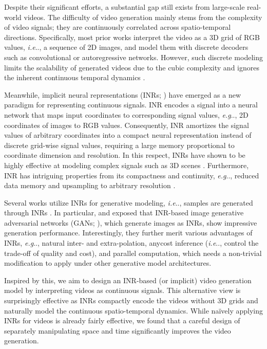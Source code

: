 \documentclass{article} \usepackage{iclr2022_conference,times}
\makeatletter
\DeclareRobustCommand\onedot{\futurelet\@let@token\@onedot}
\def\@onedot{\ifx\@let@token.\else.\null\fi\xspace}
\def\eg{\emph{e.g}\onedot} \def\Eg{\emph{E.g}\onedot}
\def\ie{\emph{i.e}\onedot} \def\Ie{\emph{I.e}\onedot}
\makeatother
\begin{document}
Despite their significant efforts, a substantial gap still exists from large-scale real-world videos. The difficulty of video generation mainly stems from the complexity of video signals; they are continuously correlated across spatio-temporal directions. Specifically, most prior works interpret the video as a 3D grid of RGB values, \ie, a sequence of 2D images, and model them with discrete decoders such as convolutional \citep{tian2021good} or autoregressive \citep{yan2021videogpt} networks. However, such discrete modeling limits the scalability of generated videos due to the cubic complexity \citep{saito2020train} and ignores the inherent continuous temporal dynamics \citep{gordon2021latent}.

Meanwhile, implicit neural representations (INRs; \citet{sitzmann2020implicit, tancik2020fourier}) have emerged as a new paradigm for representing continuous signals. INR encodes a signal into a neural network that maps input coordinates to corresponding signal values, \eg, 2D coordinates of images to RGB values. Consequently, INR amortizes the signal values of arbitrary coordinates into a compact neural representation instead of discrete grid-wise signal values, requiring a large memory proportional to coordinate dimension and resolution. In this respect, INRs have shown to be highly effective at modeling complex signals such as 3D scenes \citep{mildenhall2020nerf,li2021neural}. Furthermore, INR has intriguing properties from its compactness and continuity, \eg, reduced data memory \citep{dupont2021coin} and upsampling to arbitrary resolution \citep{chen2021learning}.

Several works utilize INRs for generative modeling, \ie, samples are generated through INRs \citep{chan2021pi,dupont2021generative,kosiorek2021nerf}. In particular, \citet{skorokhodov2021adversarial} and \citet{anokhin2021image} exposed that INR-based image generative adversarial networks (GANs; \citet{goodfellow2014generative}), which generate images as INRs, show impressive generation performance. Interestingly, they further merit various advantages of INRs, \eg, natural inter- and extra-polation, anycost inference (\ie, control the trade-off of quality and cost), and parallel computation, which needs a non-trivial modification to apply under other generative model architectures.

Inspired by this, we aim to design an INR-based (or implicit) video generation model by interpreting videos as continuous signals. This alternative view is surprisingly effective as INRs compactly encode the videos without 3D grids and naturally model the continuous spatio-temporal dynamics. While na\"ively applying INRs for videos is already fairly effective, we found that a careful design of separately manipulating space and time significantly improves the video generation.
\end{document}
